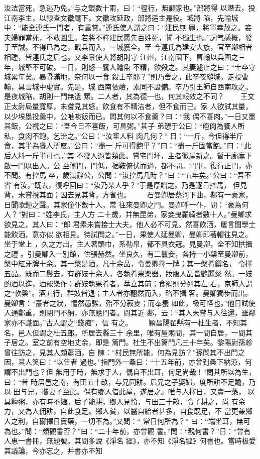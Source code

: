 \documentclass{ctexart}
\begin{document}
汝法當死，急逃乃免。''与之銀數十兩，曰：``徑行，無顧家也。''部將得 以潛去，投江南李主，以隸查文徽麾下。文徽攻延政，部將适主是役。城將 陷，先喻城中：``能全連氏一門者，有重賞。''連氏使人謂之曰：``建民無 罪，將軍幸赦之。妾夫婦罪當死，不敢圖生。若將不釋建民愿先百姓死，誓 不獨生也。''詞气感概，發于至誠。不得已為之，戢兵而入，一城獲全。至 今連氏為建安大族，官至卿相者相踵，皆連氏之后也。又李景使大將胡則守 江州，江南國下，曹翰以兵圍之三年，城堅不可破。一日，則怒一饔人鱠魚 不精，欲殺之。其妻遽止之曰：``士卒守城累年矣。暴骨滿地，奈何以一食 殺士卒耶？''則乃舍之。此卒夜縋城，走投曹翰，具言城中虛實。先是，城 西南依嶮，素同不設備。卒乃引王師自西南攻之。是夜城陷，胡則一門無遺 類。二人者，其為德一也，何其報效之不同？ 　　王文正太尉局量寬厚，未嘗見其怒。飲食有不精洁者，但不食而已。家 人欲試其量，以少埃墨投羹中，公唯啖飯而已。問其何以不食羹？曰：``我 偶不喜肉。''一日又墨其飯，公視之曰：``吾今日不喜飯，可具粥。''其子 弟愬于公曰：``庖肉為饔人所私，食肉不飽，乞治之。''公曰：``汝輩人料 肉几何？'' 日：``一斤，今但得半斤食，其半為饔人所廋。''公曰：``盡一 斤可得飽乎？''曰：``盡一斤固當飽。''曰：``此后人料一斤半可也。''其 不發人過皆類此。嘗宅門坏，主者徹屋新之。暫于廊廡下啟一門以出入。公 至側門，門低，据鞍俯伏而過，都不問。門畢，復行正門，亦不問。有控馬 卒，歲滿辭公，公問：``汝控馬几時？''曰：``五年矣。''公曰：``吾不省 有汝。''既去，復呼回曰：``汝乃某人乎？''于是厚贈之。乃是逐日控馬， 但見背，未嘗視其面；因去見其背，方省也。 　　石曼卿居蔡河下曲，鄰有一豪家，日聞歌鐘之聲。其家僮仆數十人，常 往來曼卿之門。曼卿呼一仆，問：``豪為何人？''對曰：``姓李氏，主人方 二十歲，并無昆弟，家妾曳羅綺者數十人。''曼卿求欲見之，其人曰：``郎 君素未嘗接士大夫，他人必不可見。然喜飲洒，屢言聞學士能飲洒，意亦似 欲相見。待試問之。''一日，果使人延曼卿，曼卿即著帽往見之。坐于堂上 ，久之方出。主人著頭巾，系勒帛，都不具衣冠。見曼卿，全不知拱揖之禮 。引曼卿入一別館，供張赫然。坐良久，有二鬟妾，各持一小槃至曼卿前， 槃中紅牙牌十余。其一槃是酒，凡十余品，令曼卿擇一牌；其一槃肴饌名， 令擇五品。既而二鬟去，有群妓十余人，各執肴果樂器，妝服人品皆艷麗粲 然。一妓酌酒以進，酒罷樂作；群妓執果肴者，萃立其前；食罷則分列其左 右，京師人謂之``軟槃''。酒五行，群妓皆退；主人者亦翩然而入，略不揖 客。曼卿獨步而出。曼卿言：``豪者之狀，懵然愚騃，殆不分菽麥；而奉養 如此，极可怪也。''他日試使人通鄭重，則閉門不納，亦無應門者。問其近 鄰，云：``其人未嘗与人往還，雖鄰家亦不識面。''古人謂之``錢痴''，信 有之。 　　穎昌陽翟縣有一杜生者，不知其名，邑人但謂之杜五郎。所居去縣三十 余里，唯有屋兩間，其一間自居，一間其子居之。室之前有空地丈余，即是 篱門。杜生不出篱門凡三十年矣。黎陽尉孫軫曾往訪之，見其人頗蕭洒，自 陳：``村民無所能，何為見訪？''孫問其不出門之因，其人笑曰：``以告者 過也。''指門外一桑曰：``十五年前，亦曾到桑下納涼，何謂不出門也？但 無用于時，無求于人，偶自不出耳，何足尚哉！''問其所以為生，曰：``昔 時居邑之南，有田五十畝，与兄同耕。后兄之子娶婦，度所耕不足贍，乃以 田与兄，攜妻子至此。偶有鄉人借此屋，遂居之。唯与人擇日，又賣一藥， 以具饘粥，亦有時不繼。后子能耕，鄉人見怜，与田三十畝，令子耕之，尚 有余力，又為人佣耕，自此食足。鄉人貧，以醫自給者甚多，自食既足，不 當更兼鄉人之利，自爾擇日賣藥，一切不為。''又問：`` 常日何所為？'' 曰：``端坐耳，無可為也。''問：``頗觀書否？''曰：``二十年前，亦曾觀 書。''問：``觀何書？''日：``曾有人惠一書冊，無題號。其間多說《淨名 經》，亦不知《淨名經》何書也。當時极愛其議論，今亦忘之，并書亦不知 
\end{document}
